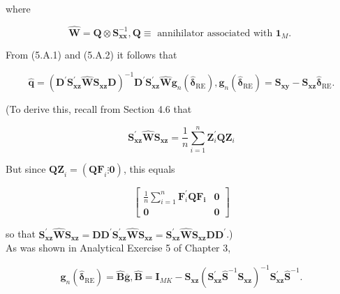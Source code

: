 \documentclass[10pt]{article}
\begin{document}
where

$$
\widehat{\mathbf{W}}=\mathbf{Q} \otimes \mathbf{S}_{\mathbf{x x}}^{-1}, \mathbf{Q} \equiv \text { annihilator associated with } \mathbf{1}_{M} \text {. }
$$

From (5.A.1) and (5.A.2) it follows that


\begin{equation*}
\hat{\mathbf{q}}=\left(\mathbf{D}^{\prime} \mathbf{S}_{\mathbf{x z}}^{\prime} \widehat{\mathbf{W}} \mathbf{S}_{\mathbf{x z}} \mathbf{D}\right)^{-1} \mathbf{D}^{\prime} \mathbf{S}_{\mathbf{x z}}^{\prime} \widehat{\mathbf{W}} \mathbf{g}_{n}\left(\hat{\boldsymbol{\delta}}_{\mathrm{RE}}\right), \mathbf{g}_{n}\left(\hat{\boldsymbol{\delta}}_{\mathrm{RE}}\right)=\mathbf{S}_{\mathbf{x y}}-\mathbf{S}_{\mathbf{x z}} \hat{\boldsymbol{\delta}}_{\mathrm{RE}} . \tag{5.A.3}
\end{equation*}


(To derive this, recall from Section 4.6 that

$$
\mathbf{S}_{\mathbf{x z}}^{\prime} \widehat{\mathbf{W}} \mathbf{S}_{\mathbf{x z}}=\frac{1}{n} \sum_{i=1}^{n} \mathbf{Z}_{i}^{\prime} \mathbf{Q} \mathbf{Z}_{i}
$$

But since $\mathbf{Q Z}_{i}=\left(\mathbf{Q F}_{i} \vdots \mathbf{0}\right)$, this equals

\[
\left[\begin{array}{cc}
\frac{1}{n} \sum_{i=1}^{n} \mathbf{F}_{i}^{\prime} \mathbf{Q F _ { i }} & \mathbf{0}  \tag{5.A.4}\\
\mathbf{0} & \mathbf{0}
\end{array}\right]
\]

so that $\mathbf{S}_{\mathbf{x z}}^{\prime} \widehat{\mathbf{W}} \mathbf{S}_{\mathbf{x z}}=\mathbf{D D}^{\prime} \mathbf{S}_{\mathbf{x z}}^{\prime} \widehat{\mathbf{W}} \mathbf{S}_{\mathbf{x z}}=\mathbf{S}_{\mathbf{x z}}^{\prime} \widehat{\mathbf{W}} \mathbf{S}_{\mathbf{x z}} \mathbf{D D}^{\prime}$.)\\
As was shown in Analytical Exercise 5 of Chapter 3,


\begin{equation*}
\mathbf{g}_{n}\left(\hat{\boldsymbol{\delta}}_{\mathrm{RE}}\right)=\widehat{\mathbf{B}} \overline{\mathbf{g}}, \widehat{\mathbf{B}}=\mathbf{I}_{M K}-\mathbf{S}_{\mathbf{x z}}\left(\mathbf{S}_{\mathbf{x z}}^{\prime} \widehat{\mathbf{S}}^{-1} \mathbf{S}_{\mathbf{x z}}\right)^{-1} \mathbf{S}_{\mathbf{x z}}^{\prime} \widehat{\mathbf{S}}^{-1} . \tag{5.A.5}
\end{equation*}
\end{document}
